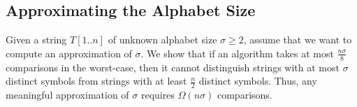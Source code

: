 \iffalse
\begin{lemma}
Let $\Gamma$
be the number of distinct colors in the conflict graph, let $m$
be the number of colorless nodes, and let $d_{\max}$ be the maximum degree of any colorless node. Then for every $s \in \{\max\{\Gamma, d_{\max} + 1\}, \dots, \max\{\Gamma + m, d_{\max} + 1\}$, some string in $\mathcal T$ contains exactly $\sigma$ distinct symbols.
\end{lemma}
\begin{proof}
In order to obtain a string with $\Gamma + d_{\max} + 1$ distinct colors, we simply color the colorless nodes in $d_{\max} + 1$ previously unused colors (which is easily possible because we can always avoid the colors of the at most $d_{\max}$ adjacent nodes). It is easy to see that instead of using only $d_{\max} + 1$ new colors, we could just as well use any larger number of new colors, but at most $m$.
\end{proof}
\fi
%


\def\sigmaapprox{\tilde{\sigma}}


\subsection{Approximating the Alphabet Size}
\label{sec:loweralphaapprox}



Given a string $T[1..n]$ of unknown alphabet size $\sigma \geq 2$, 
assume that we want to compute an approximation of $\sigma$.
We show that if an algorithm takes at most $\frac{n\sigma} 8$ comparisons in the worst-case, then it cannot distinguish strings with at most $\sigma$ distinct symbols from strings with at least $\frac n 2$ distinct symbols.
Thus, any meaningful approximation of $\sigma$ requires $\Omega(n\sigma)$ comparisons.

